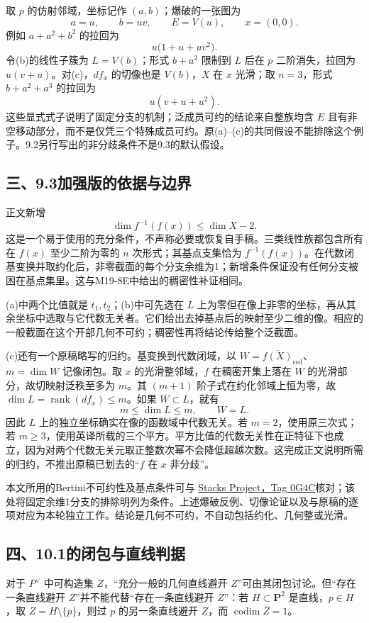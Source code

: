 \documentclass[UTF8,a4paper]{ctexbook}
\begin{document}
取 $p$ 的仿射邻域，坐标记作 $(a,b)$；爆破的一张图为
\[
 a=u,\qquad b=uv,\qquad E=V(u),\qquad x=(0,0).
\]
例如 $a+a^2+b^2$ 的拉回为
\[
 u\bigl(1+u+uv^2\bigr).
\]
令(b)的线性子簇为 $L=V(b)$；形式 $b+a^2$ 限制到 $L$ 后在 $p$ 二阶消失，拉回为 $u(v+u)$。对(c)，$df_x$ 的切像也是 $V(b)$，$X$ 在 $x$ 光滑；取 $n=3$，形式 $b+a^2+a^3$ 的拉回为
\[
 u(v+u+u^2).
\]
这些显式式子说明了固定分支的机制；泛成员可约的结论来自整族均含 $E$ 且有非空移动部分，而不是仅凭三个特殊成员可约。原(a)--(c)的共同假设不能排除这个例子。9.2另行写出的非分歧条件不是9.3的默认假设。

\subsection*{三、9.3加强版的依据与边界}
正文新增
\[
 \dim f^{-1}(f(x))\le\dim X-2.
\]
这是一个易于使用的充分条件，不声称必要或恢复自手稿。三类线性族都包含所有在 $f(x)$ 至少二阶为零的 $n$ 次形式；其基点支集恰为 $f^{-1}(f(x))$。在代数闭基变换并取约化后，非零截面的每个分支余维为1；新增条件保证没有任何分支被困在基点集里。这与M19-8E中给出的稠密性补证相同。

(a)中两个比值就是 $t_1,t_2$；(b)中可先选在 $L$ 上为零但在像上非零的坐标，再从其余坐标中选取与它代数无关者。它们给出去掉基点后的映射至少二维的像。相应的一般截面在这个开部几何不可约；稠密性再将结论传给整个泛截面。

(c)还有一个原稿略写的归约。基变换到代数闭域，以 $W=\overline{f(X)}_{\mathrm{red}}$、$m=\dim W$ 记像闭包。取 $x$ 的光滑整邻域，$f$ 在稠密开集上落在 $W$ 的光滑部分，故切映射泛秩至多为 $m$。其 $(m+1)$ 阶子式在约化邻域上恒为零，故 $\dim L=\operatorname{rank}(df_x)\le m$。如果 $W\subset L$，就有
\[
 m\le\dim L\le m,
 \qquad W=L.
\]
因此 $L$ 上的独立坐标确实在像的函数域中代数无关。若 $m=2$，使用原三次式；若 $m\ge3$，使用英译所载的三个平方。平方比值的代数无关性在正特征下也成立，因为对两个代数无关元取正整数次幂不会降低超越次数。这完成正文说明所需的归约，不推出原稿已划去的“$f$ 在 $x$ 非分歧”。

本文所用的Bertini不可约性及基点条件可与
\href{https://stacks.math.columbia.edu/tag/0G4C}{Stacks Project，Tag 0G4C}核对；该处将固定余维1分支的排除明列为条件。上述爆破反例、切像论证以及与原稿的逐项对应为本轮独立工作。结论是几何不可约，不自动包括约化、几何整或光滑。

\subsection*{四、10.1的闭包与直线判据}
对于 $P^\vee$ 中可构造集 $Z$，“充分一般的几何直线避开 $Z$”可由其闭包讨论。但“存在一条直线避开 $Z$”并不能代替“存在一条直线避开 $\overline Z$”：若 $H\subset\mathbf P^2$ 是直线，$p\in H$，取 $Z=H\setminus\{p\}$，则过 $p$ 的另一条直线避开 $Z$，而 $\operatorname{codim}\overline Z=1$。
\end{document}
